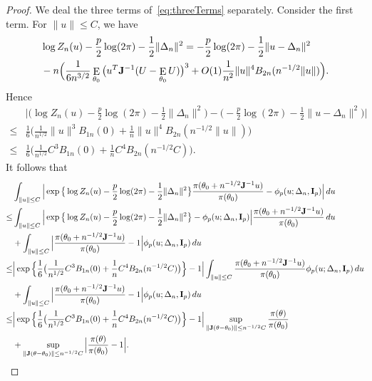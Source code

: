 \documentclass[11pt, letterpaper]{article}
\DeclareMathOperator{\myE}{E}
\theoremstyle{plain}
\theoremstyle{definition}
\theoremstyle{remark}
\begin{document}
\begin{proof}
    We deal the three terms of~\eqref{eq:threeTerms} separately.
    Consider the first term. For $\|u\|\leq C$, we have
    $$
    \begin{aligned}
        &\log Z_n(u)-\frac{p}{2}\log (2\pi)-\frac{1}{2}\|\Delta_n\|^2
        =-\frac{p}{2}\log (2\pi)-\frac{1}{2}\|u-\Delta_n\|^2\\
    &-n\Big(\frac{1}{6 n^{3/2}}\myE_{\theta_0}\big(u^T \BJ^{-1}(U-\myE_{\theta_0}U)\big)^3+O(1)\frac{1}{n^2}\|u\|^4 B_{2n}(n^{-1/2}\|u\|)\Big).
    \end{aligned}
    $$
    Hence
    \begin{equation}\label{eq:estimateLikelihood}
        \begin{aligned}
            &\Big|\Big(\log Z_n(u)-\frac{p}{2}\log (2\pi)-\frac{1}{2}\|\Delta_n\|^2\Big)
        -\Big(-\frac{p}{2}\log (2\pi)-\frac{1}{2}\|u-\Delta_n\|^2\Big)\Big|\\
            \leq&
            \frac{1}{6}\Big(
    \frac{1}{n^{1/2}}\|u\|^3 B_{1n}(0)+\frac{1}{n}\|u\|^4 B_{2n}(n^{-1/2}\|u\|)
    \Big)\\
            \leq&
            \frac{1}{6}\Big(
    \frac{1}{n^{1/2}}C^3 B_{1n}(0)+\frac{1}{n}C^4 B_{2n}(n^{-1/2}C)
    \Big).
        \end{aligned}
    \end{equation}
    It follows that
    $$
  \begin{aligned}  
      &\int_{\|u\|\leq C} \Big|
\exp\big\{\log Z_n(u) -\frac{p}{2}\log (2\pi)-\frac{1}{2}\|\Delta_n\|^2\big\}
\frac{\pi(\theta_0+n^{-1/2} \mathbf{J}^{-1}u)}{\pi(\theta_0)}
        -
        \phi_p(u;\Delta_n,\mathbf{I}_p)
        \Big| \, du\\
      \leq&\int_{\|u\|\leq C} \Big|
\exp\big\{\log Z_n(u) -\frac{p}{2}\log (2\pi)-\frac{1}{2}\|\Delta_n\|^2\big\}
        -
        \phi_p(u;\Delta_n,\mathbf{I}_p)  \Big| 
\frac{\pi(\theta_0+n^{-1/2} \mathbf{J}^{-1}u)}{\pi(\theta_0)}
        \, du\\
      &+
      \int_{\|u\|\leq C} \Big|
\frac{\pi(\theta_0+n^{-1/2} \mathbf{J}^{-1}u)}{\pi(\theta_0)}-1
      \Big|
        \phi_p(u;\Delta_n,\mathbf{I}_p)
         \, du\\
\leq&
      \Big|
      \exp\Big\{\frac{1}{6}\big(
    \frac{1}{n^{1/2}}C^3 B_{1n}(0)+\frac{1}{n}C^4 B_{2n}(n^{-1/2}C)
      \big)\Big\}
        -
        1
          \Big| 
      \int_{\|u\|\leq C} 
\frac{\pi(\theta_0+n^{-1/2} \mathbf{J}^{-1}u)}{\pi(\theta_0)}
\phi_p(u;\Delta_n,\mathbf{I}_p)
        \, du\\
      &+
      \int_{\|u\|\leq C} \Big|
\frac{\pi(\theta_0+n^{-1/2} \mathbf{J}^{-1}u)}{\pi(\theta_0)}-1
      \Big|
        \phi_p(u;\Delta_n,\mathbf{I}_p)
         \, du\\
\leq&
      \Big|
      \exp\Big\{\frac{1}{6}\big(
    \frac{1}{n^{1/2}}C^3 B_{1n}(0)+\frac{1}{n}C^4 B_{2n}(n^{-1/2}C)
      \big)\Big\}
        -
        1
          \Big| 
      \sup_{\|\mathbf{J}(\theta-\theta_0)\|\leq n^{-1/2} C}\frac{\pi(\theta)}{\pi(\theta_0)}\\
      &+
      \sup_{\|\mathbf{J}(\theta-\theta_0)\|\leq n^{-1/2} C}
      \Big|\frac{\pi(\theta)}{\pi(\theta_0)}-1\Big|.
  \end{aligned}
    $$


\end{proof}
\end{document}
